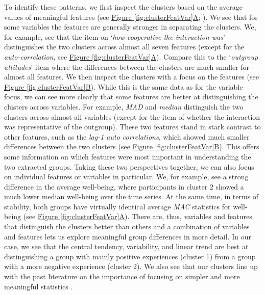 \documentclass[man, 12pt, a4paper, floatsintext]{apa7}
\theoremstyle{break}
\theoremstyle{plain}
\newcommand{\fgrref}[2][]{\hyperref[#2]{Figure \ref*{#2}#1}}
\begin{document}
To identify these patterns, we first inspect the clusters based on the
average values of meaningful features (see
\fgrref[A]{fig:clusterFeatVar}; \citealp{Kennedy2021}). We see that for
some variables the features are generally stronger in separating the
clusters. We, for example, see that the item on
`\textit{how cooperative the interaction was}' distinguishes the two
clusters across almost all seven features (except for the
\textit{auto-correlation}, see \fgrref[A]{fig:clusterFeatVar}). Compare
this to the `\textit{outgroup attitudes}' item where the differences
between the clusters are much smaller for almost all features. We then
inspect the clusters with a focus on the features (see
\fgrref[B]{fig:clusterFeatVar}). While this is the same data as for the
variable focus, we can see more clearly that some features are better at
distinguishing the clusters across variables. For example, \textit{MAD}
and \textit{median} distinguish the two clusters across almost all
variables (except for the item of whether the interaction was
representative of the outgroup). These two features stand in stark
contrast to other features, such as the
\textit{lag-1 auto correlations}, which showed much smaller differences
between the two clusters (see \fgrref[B]{fig:clusterFeatVar}). This
offers some information on which features were most important in
understanding the two extracted groups. Taking these two perspectives
together, we can also focus on individual features or variables in
particular. We, for example, see a strong difference in the average
well-being, where participants in cluster 2 showed a much lower median
well-being over the time series. At the same time, in terms of
stability, both groups have virtually identical average \textit{MAC}
statistics for well-being (see \fgrref[A]{fig:clusterFeatVar}). There
are, thus, variables and features that distinguish the clusters better
than others and a combination of variables and features lets us explore
meaningful group differences in more detail. In our case, we see that
the central tendency, variability, and linear trend are best at
distinguishing a group with mainly positive experiences (cluster 1) from
a group with a more negative experience (cluster 2). We also see that
our clusters line up with the past literature on the importance of
focusing on simpler and more meaningful statistics
\citep{bringmann2018c, eronen2021a}.
\end{document}

